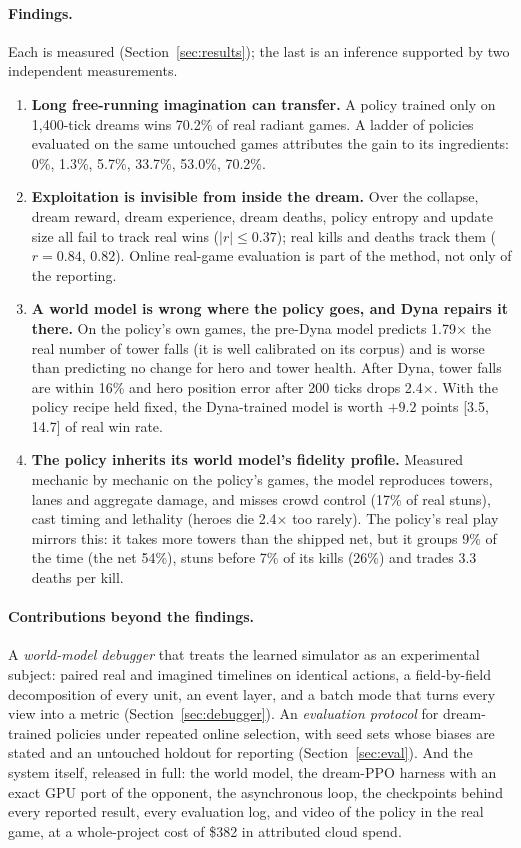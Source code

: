 \documentclass[11pt]{article}
\begin{document}
\paragraph{Findings.} Each is measured (Section~\ref{sec:results}); the last is an inference supported by two independent measurements.
\begin{enumerate}[leftmargin=*]
  \item \textbf{Long free-running imagination can transfer.} A policy trained only on 1,400-tick dreams wins 70.2\% of real radiant games. A ladder of policies evaluated on the same untouched games attributes the gain to its ingredients: 0\%, 1.3\%, 5.7\%, 33.7\%, 53.0\%, 70.2\%.
  \item \textbf{Exploitation is invisible from inside the dream.} Over the collapse, dream reward, dream experience, dream deaths, policy entropy and update size all fail to track real wins ($|r|\le 0.37$); real kills and deaths track them ($r=0.84$, $0.82$). Online real-game evaluation is part of the method, not only of the reporting.
  \item \textbf{A world model is wrong where the policy goes, and Dyna repairs it there.} On the policy's own games, the pre-Dyna model predicts 1.79$\times$ the real number of tower falls (it is well calibrated on its corpus) and is worse than predicting no change for hero and tower health. After Dyna, tower falls are within 16\% and hero position error after 200 ticks drops 2.4$\times$. With the policy recipe held fixed, the Dyna-trained model is worth $+9.2$ points [3.5, 14.7] of real win rate.
  \item \textbf{The policy inherits its world model's fidelity profile.} Measured mechanic by mechanic on the policy's games, the model reproduces towers, lanes and aggregate damage, and misses crowd control (17\% of real stuns), cast timing and lethality (heroes die 2.4$\times$ too rarely). The policy's real play mirrors this: it takes more towers than the shipped net, but it groups 9\% of the time (the net 54\%), stuns before 7\% of its kills (26\%) and trades 3.3 deaths per kill.
\end{enumerate}

\paragraph{Contributions beyond the findings.} A \emph{world-model debugger} that treats the learned simulator as an experimental subject: paired real and imagined timelines on identical actions, a field-by-field decomposition of every unit, an event layer, and a batch mode that turns every view into a metric (Section~\ref{sec:debugger}). An \emph{evaluation protocol} for dream-trained policies under repeated online selection, with seed sets whose biases are stated and an untouched holdout for reporting (Section~\ref{sec:eval}). And the system itself, released in full: the world model, the dream-PPO harness with an exact GPU port of the opponent, the asynchronous loop, the checkpoints behind every reported result, every evaluation log, and video of the policy in the real game, at a whole-project cost of \$382 in attributed cloud spend.
\end{document}
